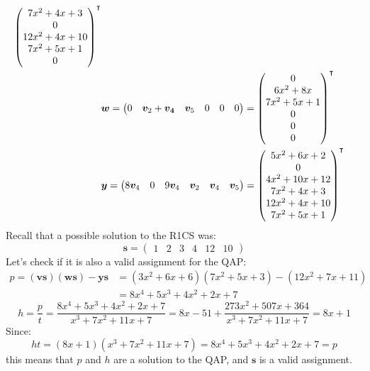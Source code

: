 \begin{example}
\begin{align*}
{\begin{pmatrix}
			   7x^2 + 4x + 3   \\
			   0               \\
			   12x^2 + 4x + 10 \\
			   7x^2 + 5x + 1   \\
			   0
		   \end{pmatrix}}^\transpose                                           \\
		 & \bm{w} =
		\begin{pmatrix}
			0 & \bm{v}_2 + \bm{v_4} & \bm{v}_5 & 0 & 0 & 0
		\end{pmatrix}
		= {\begin{pmatrix}
			   0             \\
			   6x^2 + 8x     \\
			   7x^2 + 5x + 1 \\
			   0             \\
			   0             \\
			   0
		   \end{pmatrix}}^\transpose                                                \\
		 & \bm{y} =
		\begin{pmatrix}
			8\bm{v}_4 & 0 & 9\bm{v}_4 & \bm{v}_2 & \bm{v}_4 & \bm{v}_5
		\end{pmatrix}
		=
		{\begin{pmatrix}
			 5x^2 + 6x + 2   \\
			 0               \\
			 4x^2 + 10x + 12 \\
			 7x^2 + 4x + 3   \\
			 12x^2 + 4x + 10 \\
			 7x^2 + 5x + 1
		 \end{pmatrix}}^\transpose
	\end{align*}
	Recall that a possible solution to the R1CS was:
	\[\bm{s} = \begin{pmatrix} 1 & 2 & 3 & 4 & 12 & 10 \end{pmatrix}\]
	Let's check if it is also a valid assignment for the QAP\@:
	\begin{align*}
		p	    = (\bm{v}\bm{s})(\bm{w}\bm{s}) - \bm{y}\bm{s}
		 & = (3x^2 + 6x + 6)(7x^2 + 5x + 3) - (12x^2 + 7x + 11) \\
		 & = 8x^4 + 5x^3 + 4x^2 + 2x + 7
	\end{align*}
	\[
		h = \frac{p}{t} = \frac{8x^4 + 5x^3 + 4x^2 + 2x + 7}{x^3 + 7x^2 + 11x + 7} =
		8x - 51 + \frac{273x^2 + 507x + 364}{x^3 + 7x^2 + 11x + 7} = 8x + 1
	\]
	Since:
	\[ht = (8x + 1)(x^3 + 7x^2 + 11x + 7) = 8x^4 + 5x^3 + 4x^2 + 2x + 7 = p\]
	this means that \(p\) and \(h\) are a solution to the QAP, and \(\bm{s}\) is a valid
	assignment.
\end{example}

